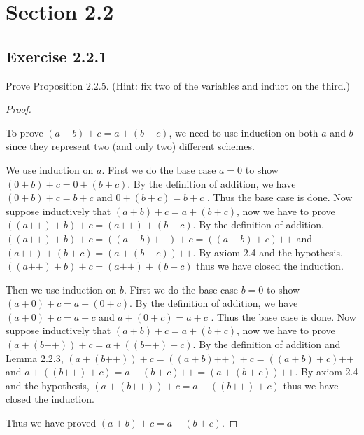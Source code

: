 \documentclass[a4paper]{article}
\begin{document}
\section*{Section 2.2}

\subsection*{Exercise 2.2.1}

Prove Proposition 2.2.5. (Hint: fix two of the variables and induct on the third.)

\begin{proof}

$ $\newline

To prove $\left( a+b \right) + c = a + \left( b+c \right) $, we need to use induction on both $a$ and $b$ since they represent two (and only two) different schemes.

We use induction on $a$. First we do the base case $a = 0$ to show $\left( 0+b \right) +c = 0+\left( b+c \right) $. By the definition of addition, we have $\left( 0+b \right) +c = b + c$ and $0+\left( b+c \right) = b+c$ . Thus the base case is done. Now suppose inductively that $\left( a+b \right) +c = a+\left( b+c \right) $, now we have to prove $\left( \left(  a \text{++} \right) +b \right) +c = \left( a \text{++} \right)  +\left( b+c \right) $. By the definition of addition, $\left( \left(  a \text{++} \right) +b \right) +c = \left( \left( a + b \right) \text{++} \right) + c = \left( \left( a + b \right)  + c \right) \text{++} $ and $\left( a \text{++} \right)  +\left( b+c \right) = \left( a + \left( b + c \right)  \right) \text{++} $. By axiom 2.4 and the hypothesis, $\left( \left( a \text{++} \right) + b \right) + c = \left( a \text{++} \right) + \left( b + c \right) $ thus we have closed the induction.

Then we use induction on $b$. First we do the base case $b = 0$ to show $\left( a+0 \right) +c = a+\left( 0+c \right) $. By the definition of addition, we have $\left( a+0 \right) +c = a + c$ and $a+\left( 0+c \right) = a+c$ . Thus the base case is done. Now suppose inductively that $\left( a+b \right) +c = a+\left( b+c \right) $, now we have to prove $\left( a + \left(  b \text{++} \right) \right) +c = a + \left( \left( b \text{++} \right) + c \right) $. By the definition of addition and Lemma 2.2.3, $\left( a + \left(  b \text{++} \right) \right) +c = \left( \left( a + b \right) \text{++} \right) + c = \left( \left( a + b \right) + c \right) \text{++} $ and $a + \left( \left( b \text{++} \right) + c \right) = a + \left( b + c \right) \text{++} = \left( a + \left( b + c \right)  \right) \text{++} $. By axiom 2.4 and the hypothesis, $\left( a + \left(  b \text{++} \right) \right) +c = a + \left( \left( b \text{++} \right) + c \right) $ thus we have closed the induction.

Thus we have proved $\left( a+b \right) + c = a + \left( b+c \right) $.

\end{proof}
\end{document}
